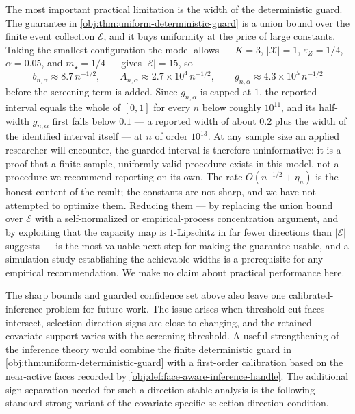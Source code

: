 \documentclass[11pt]{article}
\begin{document}
The most important practical limitation is the width of the deterministic guard.  The
guarantee in \cref{obj:thm:uniform-deterministic-guard} is a union bound over the finite event
collection \(\mathcal E\), and it buys uniformity at the price of large constants.  Taking the
smallest configuration the model allows --- \(K=3\), \(|\mathcal X|=1\), \(\varepsilon_Z=1/4\),
\(\alpha=0.05\), and \(m_\star=1/4\) --- gives \(|\mathcal E|=15\), so
\[
b_{n,\alpha}\approx 8.7\,n^{-1/2},
\qquad
A_{n,\alpha}\approx 2.7\times10^{4}\,n^{-1/2},
\qquad
g_{n,\alpha}\approx 4.3\times10^{5}\,n^{-1/2}
\]
before the screening term is added.  Since \(g_{n,\alpha}\) is capped at \(1\), the reported
interval equals the whole of \([0,1]\) for every \(n\) below roughly \(10^{11}\), and its
half-width \(g_{n,\alpha}\) first falls below \(0.1\) --- a reported width of about \(0.2\) plus the
width of the identified interval itself --- at \(n\) of order \(10^{13}\).  At any sample size an applied researcher will
encounter, the guarded interval is therefore uninformative: it is a proof that a finite-sample,
uniformly valid procedure exists in this model, not a procedure we recommend reporting on its own.
The rate \(O(n^{-1/2}+\eta_n)\) is the honest content of the result; the constants are not sharp,
and we have not attempted to optimize them.  Reducing them --- by replacing the union bound over
\(\mathcal E\) with a self-normalized or empirical-process concentration argument, and by exploiting
that the capacity map is \(1\)-Lipschitz in far fewer directions than \(|\mathcal E|\) suggests ---
is the most valuable next step for making the guarantee usable, and a simulation study establishing
the achievable widths is a prerequisite for any empirical recommendation.  We make no claim about
practical performance here.

The sharp bounds and guarded confidence set above also leave one calibrated-inference problem for
future work.  The issue arises when threshold-cut faces intersect, selection-direction signs are close to changing, and the retained covariate support varies with the screening threshold.  A useful strengthening of the inference theory would combine the finite deterministic guard in \cref{obj:thm:uniform-deterministic-guard} with a first-order calibration based on the near-active faces recorded by \cref{obj:def:face-aware-inference-handle}.  The additional sign separation needed for such a direction-stable analysis is the following standard strong variant of the covariate-specific selection-direction condition.
\end{document}
